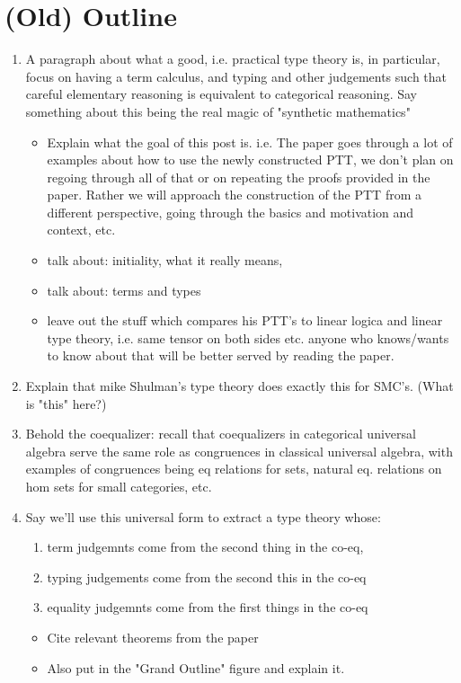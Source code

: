 \documentclass[pra,floatfix,
amsmath,superscriptaddress, 12pt]{article}
\theoremstyle{definition}
\begin{document}
\section{(Old) Outline}


\begin{enumerate}

\item A paragraph about what a good, i.e. practical type theory is, in particular, focus on having a term calculus, and typing and other judgements such that careful elementary reasoning is equivalent to categorical reasoning. Say something about this being the real magic of "synthetic mathematics"
	\begin{itemize}
		\item Explain what the goal of this post is. i.e. The paper goes through a lot of examples about how to use the newly constructed PTT, we don't plan on regoing through all of that or on repeating the proofs provided in the paper. Rather we will approach the construction of the PTT from a different perspective, going through the basics and motivation and context, etc.
		
\item talk about: initiality, what it really means,

\item talk about: terms and types

\item leave out the stuff which compares his PTT's to linear logica and linear type theory, i.e. same tensor on both sides etc. anyone who knows/wants to know about that will be better served by reading the paper.
	\end{itemize}

\item Explain that mike Shulman's type theory does exactly this for SMC's. {\color{red} (What is "this" here?)}


\item Behold the coequalizer: recall that coequalizers in categorical universal algebra serve the same role as congruences in classical universal algebra, with examples of congruences being eq relations for sets, natural eq. relations on hom sets for small categories, etc.

\item Say we'll use this universal form to extract a type theory whose:
\begin{enumerate}
	\item term judgemnts come from the second thing in the co-eq,
	\item typing judgements come from the second this in the co-eq
	\item equality judgemnts come from the first things in the co-eq
\end{enumerate}
\begin{itemize}
	\item Cite relevant theorems from the paper
	\item Also put in the "Grand Outline" figure and explain it.
\end{itemize}



\end{enumerate}
\end{document}
